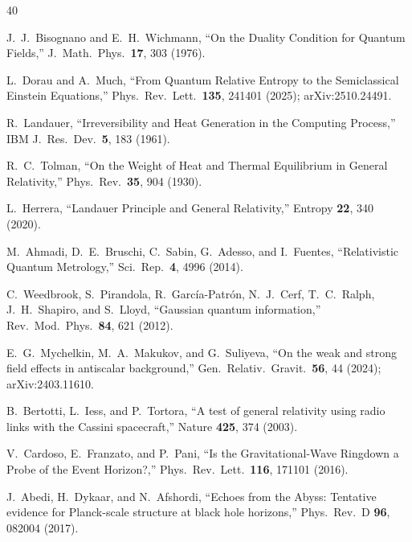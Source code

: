 \documentclass[aps,prd,preprint,superscriptaddress,longbibliography]{revtex4-2}
\begin{document}

\begin{thebibliography}{40}

J.~J.~Bisognano and E.~H.~Wichmann,
``On the Duality Condition for Quantum Fields,''
J.\ Math.\ Phys.\ \textbf{17}, 303 (1976).

L.~Dorau and A.~Much,
``From Quantum Relative Entropy to the Semiclassical Einstein Equations,''
Phys.\ Rev.\ Lett.\ \textbf{135}, 241401 (2025); arXiv:2510.24491.

R.~Landauer,
``Irreversibility and Heat Generation in the Computing Process,''
IBM J.\ Res.\ Dev.\ \textbf{5}, 183 (1961).

R.~C.~Tolman,
``On the Weight of Heat and Thermal Equilibrium in General Relativity,''
Phys.\ Rev.\ \textbf{35}, 904 (1930).

L.~Herrera,
``Landauer Principle and General Relativity,''
Entropy \textbf{22}, 340 (2020).

M.~Ahmadi, D.~E.~Bruschi, C.~Sabin, G.~Adesso, and I.~Fuentes,
``Relativistic Quantum Metrology,''
Sci.\ Rep.\ \textbf{4}, 4996 (2014).

C.~Weedbrook, S.~Pirandola, R.~Garc\'ia-Patr\'on, N.~J.~Cerf,
T.~C.~Ralph, J.~H.~Shapiro, and S.~Lloyd,
``Gaussian quantum information,''
Rev.\ Mod.\ Phys.\ \textbf{84}, 621 (2012).

E.~G.~Mychelkin, M.~A.~Makukov, and G.~Suliyeva,
``On the weak and strong field effects in antiscalar background,''
Gen.\ Relativ.\ Gravit.\ \textbf{56}, 44 (2024); arXiv:2403.11610.

B.~Bertotti, L.~Iess, and P.~Tortora,
``A test of general relativity using radio links with the Cassini
spacecraft,''
Nature \textbf{425}, 374 (2003).

V.~Cardoso, E.~Franzato, and P.~Pani,
``Is the Gravitational-Wave Ringdown a Probe of the Event Horizon?,''
Phys.\ Rev.\ Lett.\ \textbf{116}, 171101 (2016).

J.~Abedi, H.~Dykaar, and N.~Afshordi,
``Echoes from the Abyss: Tentative evidence for Planck-scale structure
at black hole horizons,''
Phys.\ Rev.\ D \textbf{96}, 082004 (2017).


\end{thebibliography}
\end{document}
